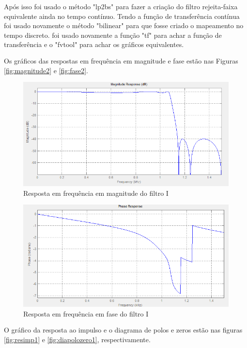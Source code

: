 \documentclass[a4paper,10pt]{article}
\begin{document}
Após isso foi usado o método "lp2bs" para fazer a criação do filtro rejeita-faixa equivalente ainda no tempo contínuo. Tendo
a função de transferência contínua foi usado novamente o método "bilinear" para que fosse criado o mapeamento no tempo discreto.
foi usado novamente a função "tf" para achar a função de transferência e o "fvtool" para achar os gráficos equivalentes.

Os gráficos das respostas em frequência em magnitude e fase estão nas Figuras \ref{fig:magnitude2} e \ref{fig:fase2}.

\begin{figure}[ht]
 \centering
 \includegraphics[width=12cm]{pictures/Filtro1/Magnitude.png}
 \caption{Resposta em frequência em magnitude do filtro I}
 \label{fig:magnitude1}
\end{figure}

\begin{figure}[ht]
 \centering
 \includegraphics[width=12cm]{pictures/Filtro1/Fase.png}
 \caption{Resposta em frequência em fase do filtro I}
 \label{fig:fase1}
\end{figure}

O gráfico da resposta ao impulso e o diagrama de polos e zeros estão nas figuras \ref{fig:resimp1} e \ref{fig:diapolozero1}, respectivamente.
\end{document}
